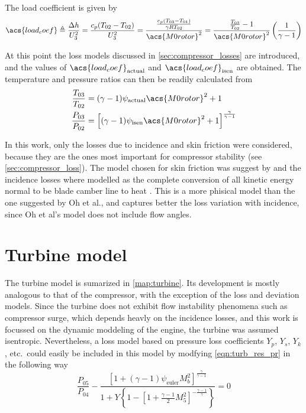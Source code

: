 \documentclass[tcc]{subfiles}
\begin{document}
The load coefficient is given by
\begin{equation}
    \acs{load_coef}\triangleq \frac{\Delta h}{U_3^2}
                      = \frac{c_p(T_{02}-T_{02})}{U_3^2}
                      = \frac{\frac{c_p(T_{03}-T_{01})}{\gamma R T_{02}}}
                                    {\acs{M0rotor}^2}
                      = \frac{\frac{T_{03}}{T_{02}}-1}
                                  {\acs{M0rotor}^2}
                        \left(\frac{1}{\gamma-1}\right)
\end{equation}

At this point the loss models discussed in \cref{sec:compressor_losses} are introduced, 
and the values of $\acs{load_coef}_{\text{actual}}$ and $\acs{load_coef}_{\text{isen}}$ are obtained.
The temperature and pressure ratios can then be readily calculated from
\begin{align}
    \label{eqn:psi2Tratio}
    \frac{T_{03}}{T_{02}} &= (\gamma - 1)\psi_{\text{actual}} \acs{M0rotor}^2 + 1 \\
    \label{eqn:psi2Pratio}
    \frac{P_{03}}{P_{02}} &= \left[(\gamma - 1)\psi_{\text{isen}} \acs{M0rotor}^2 + 1\right]^\frac{\gamma}{\gamma-1}
\end{align}

In this work, only the losses due to incidence and skin friction were considered, because they are the ones most important for compressor stability (see \cref{sec:compressor_loss}). The model chosen for skin friction was suggest by \textcite{Oh1997} and the incidence losses where modelled as the complete conversion of all kinetic energy normal to be blade camber line to heat \cite{Galvas1973}. This is a more phisical model than the one suggested by Oh et al., and captures better the loss variation with incidence, since Oh et al's model does not include flow angles. 


\section{Turbine model}


The turbine model is sumarized in \cref{map:turbine}. 
Its development is mostly analogous to that of the compressor, with the exception of the loss and deviation models. 
Since the turbine does not exhibit flow instability phenomena such as compressor surge, 
which depends heavly on the incidence losses, 
and this work is focussed on the dynamic moddeling of the engine, 
the turbine was assumed isentropic. 
Nevertheless, a loss model based on pressure loss coefficients $Y_p$, $Y_s$, $Y_k$, etc.\ 
could easily be included in this model by modfying \cref{eqn:turb_res_pr} in the following way
\begin{equation}
    \frac{P_{05}}{P_{04}} -\frac{[1 + (\gamma-1)\psi_{\text{euler}} M_b^2]^{\frac{\gamma}{\gamma-1}}}{1+Y\left\{1-\left[1+\tfrac{\gamma-1}{2}M_5^2\right]^{-\frac{\gamma-1}{\gamma}}\right\}} = 0 
\end{equation}
\end{document}
